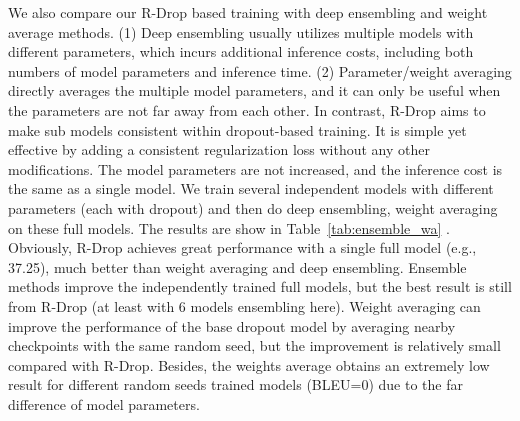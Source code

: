 \documentclass{article}
\begin{document}
We also compare our R-Drop based training with deep ensembling and weight average methods. 
(1) Deep ensembling usually utilizes multiple models with different parameters, which incurs additional inference costs, including both numbers of model parameters and inference time. 
(2) Parameter/weight averaging directly averages the multiple model parameters, and it can only be useful when the parameters are not far away from each other. 
In contrast, R-Drop aims to make sub models consistent within dropout-based training. It is simple yet effective by adding a consistent regularization loss without any other modifications. The model parameters are not increased, and the inference cost is the same as a single model.
We train several independent models with different parameters (each with dropout) and then do deep ensembling, weight averaging on these full models. The results are show in Table~\ref{tab:ensemble_wa} .
Obviously, R-Drop achieves great performance with a single full model (e.g., 37.25), much better than weight averaging and deep ensembling.
Ensemble methods improve the independently trained full models, but the best result is still from R-Drop (at least with 6 models ensembling here). 
Weight averaging can improve the performance of the base dropout model by averaging nearby checkpoints with the same random seed, but the improvement is relatively small compared with R-Drop. 
Besides, the weights average obtains an extremely low result for different random seeds trained models (BLEU=0) due to the far difference of model parameters.
\end{document}
